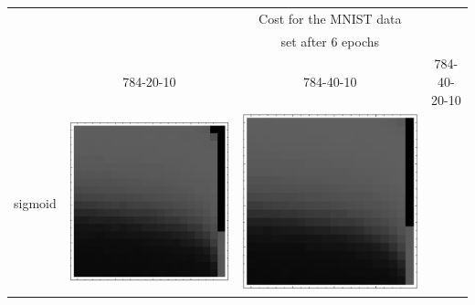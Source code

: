 \documentclass[10pt]{article}
\begin{document}
\begin{tabular}{|c|c|c|c|}
        \hline
        & & Cost for the MNIST data & \\
        & & set after 6 epochs & \\
        \hline
         & 784-20-10 & 784-40-10 & 784-40-20-10\\ \hline
sigmoid 
        & \includegraphics[scale=0.25]{plots/simple/LF-20S10S-20T10-MNIST-6.eps}
        & \includegraphics[scale=0.25]{plots/simple/LF-40S10S-20T10-MNIST-6.eps}

\end{tabular}
\end{document}
